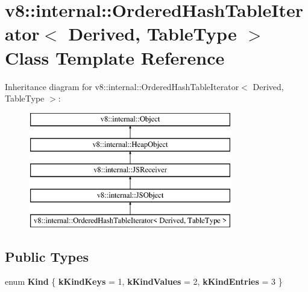 \hypertarget{classv8_1_1internal_1_1_ordered_hash_table_iterator}{}\section{v8\+:\+:internal\+:\+:Ordered\+Hash\+Table\+Iterator$<$ Derived, Table\+Type $>$ Class Template Reference}
\label{classv8_1_1internal_1_1_ordered_hash_table_iterator}
Inheritance diagram for v8\+:\+:internal\+:\+:Ordered\+Hash\+Table\+Iterator$<$ Derived, Table\+Type $>$\+:\begin{figure}[H]
\begin{center}
\leavevmode
\includegraphics[height=5.000000cm]{classv8_1_1internal_1_1_ordered_hash_table_iterator}
\end{center}
\end{figure}
\subsection*{Public Types}
\begin{DoxyCompactItemize}
\item 
\hypertarget{classv8_1_1internal_1_1_ordered_hash_table_iterator_a680eb92393cdb4b0e08ff952fdfdc653}{}enum {\bfseries Kind} \{ {\bfseries k\+Kind\+Keys} = 1, 
{\bfseries k\+Kind\+Values} = 2, 
{\bfseries k\+Kind\+Entries} = 3
 \}\label{classv8_1_1internal_1_1_ordered_hash_table_iterator_a680eb92393cdb4b0e08ff952fdfdc653}

\end{DoxyCompactItemize}
